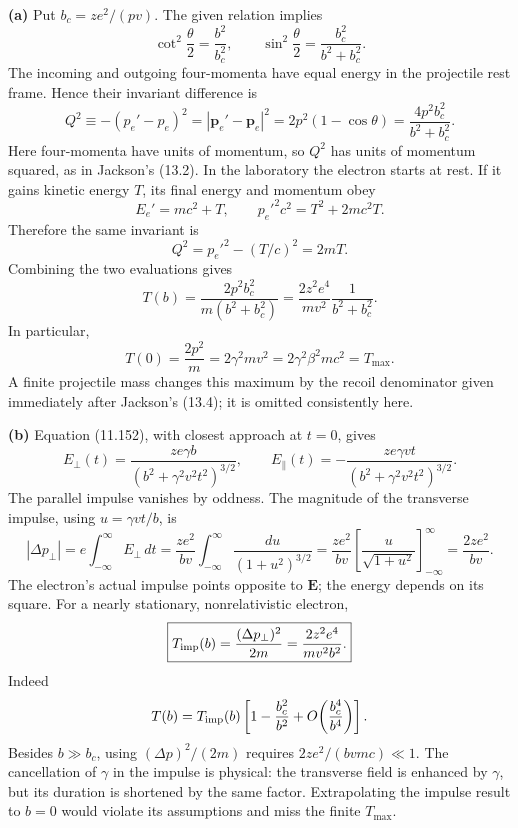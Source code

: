 \textbf{(a)} Put $b_c=ze^2/(pv)$. The given relation implies
\[
 \cot^2\frac{\theta}{2}=\frac{b^2}{b_c^2},
 \qquad
 \sin^2\frac{\theta}{2}=\frac{b_c^2}{b^2+b_c^2}.
\]
The incoming and outgoing four-momenta have equal energy in the
projectile rest frame. Hence their invariant difference is
\[
 Q^2\equiv-(p_e'-p_e)^2
 =|\mathbf p_e'-\mathbf p_e|^2
 =2p^2(1-\cos\theta)
 =\frac{4p^2b_c^2}{b^2+b_c^2}.
\]
Here four-momenta have units of momentum, so $Q^2$ has units of
momentum squared, as in Jackson's (13.2).
In the laboratory the electron starts at rest. If it gains kinetic energy
$T$, its final energy and momentum obey
\[
 E_e'=mc^2+T,\qquad p_e'^2c^2=T^2+2mc^2T.
\]
Therefore the same invariant is
\[
 Q^2=p_e'^2-(T/c)^2=2mT.
\]
Combining the two evaluations gives
\[
 \boxed{T(b)=\frac{2p^2b_c^2}{m(b^2+b_c^2)}
 =\frac{2z^2e^4}{mv^2}\frac{1}{b^2+b_c^2}.}
\]
In particular,
\[
 T(0)=\frac{2p^2}{m}=2\gamma^2mv^2
 =2\gamma^2\beta^2mc^2=T_{\max}.
\]
A finite projectile mass changes this maximum by the recoil denominator
given immediately after Jackson's (13.4); it is omitted consistently here.

\textbf{(b)} Equation (11.152), with closest approach at $t=0$, gives
\[
 E_\perp(t)=\frac{ze\gamma b}
 {(b^2+\gamma^2v^2t^2)^{3/2}},
 \qquad
 E_\parallel(t)=-\frac{ze\gamma vt}
 {(b^2+\gamma^2v^2t^2)^{3/2}}.
\]
The parallel impulse vanishes by oddness. The magnitude of the transverse
impulse, using $u=\gamma vt/b$, is
\[
 |\Delta p_\perp|
 =e\int_{-\infty}^{\infty}E_\perp\,dt
 =\frac{ze^2}{bv}
   \int_{-\infty}^{\infty}\frac{du}{(1+u^2)^{3/2}}
 =\frac{ze^2}{bv}
   \left[\frac{u}{\sqrt{1+u^2}}\right]_{-\infty}^{\infty}
 =\frac{2ze^2}{bv}.
\]
The electron's actual impulse points opposite to $\mathbf E$; the energy
depends on its square. For a nearly stationary, nonrelativistic electron,
\[
 \boxed{T_{\rm imp}(b)=\frac{(\Delta p_\perp)^2}{2m}
        =\frac{2z^2e^4}{mv^2b^2}.}
\]
Indeed
\[
 T(b)=T_{\rm imp}(b)
       \left[1-\frac{b_c^2}{b^2}
       +O\!\left(\frac{b_c^4}{b^4}\right)\right].
\]
Besides $b\gg b_c$, using $(\Delta p)^2/(2m)$ requires
$2ze^2/(bvmc)\ll1$. The cancellation of $\gamma$ in the impulse is
physical: the transverse field is enhanced by $\gamma$, but its duration
is shortened by the same factor. Extrapolating the impulse result to
$b=0$ would violate its assumptions and miss the finite $T_{\max}$.









